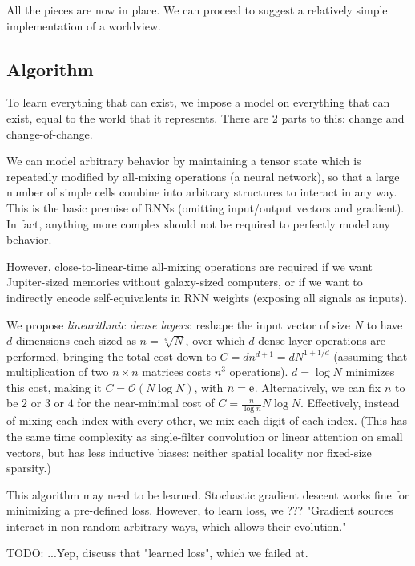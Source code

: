 \documentclass{article}
\begin{document}
All the pieces are now in place. We can proceed to suggest a relatively simple implementation of a worldview.

\subsection{Algorithm\label{Algorithm}}

To learn everything that can exist, we impose a model on everything that can exist, equal to the world that it represents. There are 2 parts to this: change and change-of-change.

We can model arbitrary behavior by maintaining a tensor state which is repeatedly modified by all-mixing operations (a neural network), so that a large number of simple cells combine into arbitrary structures to interact in any way. This is the basic premise of RNNs (omitting input/output vectors and gradient). In fact, anything more complex should not be required to perfectly model any behavior.

However, close-to-linear-time all-mixing operations are required if we want Jupiter-sized memories without galaxy-sized computers, or if we want to indirectly encode self-equivalents in RNN weights (exposing all signals as inputs).

We propose \textit{linearithmic dense layers}: reshape the input vector of size $N$ to have $d$ dimensions each sized as $n=\sqrt[d]{N}$, over which $d$ dense-layer operations are performed, bringing the total cost down to $C=dn^{d+1}=d N^{1+1/d}$ (assuming that multiplication of two $n \times n$ matrices costs $n^3$ operations). $d=\log{N}$ minimizes this cost, making it $C=\mathcal{O}(N \log{N})$, with $n={\rm e}$. Alternatively, we can fix $n$ to be $2$ or $3$ or $4$ for the near-minimal cost of $C=\frac{n}{\log{n}} N \log{N}$. Effectively, instead of mixing each index with every other, we mix each digit of each index. (This has the same time complexity as single-filter convolution or linear attention \cite{vaswani2017attention} on small vectors, but has less inductive biases: neither spatial locality nor fixed-size sparsity.)

This algorithm may need to be learned. Stochastic gradient descent \cite{saad1998on-line} works fine for minimizing a pre-defined loss. However, to learn loss, we \cite{DBLP:journals/corr/IsolaZZE16}??? "Gradient sources interact in non-random arbitrary ways, which allows their evolution."

    TODO: ...Yep, discuss that "learned loss", which we failed at.
\end{document}
